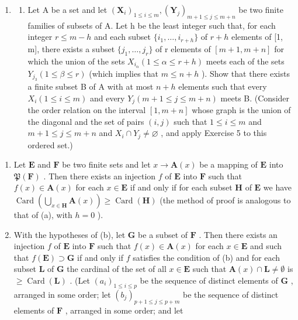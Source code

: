 \begin{enumerate}
\def\labelenumi{\arabic{enumi}.}
\setcounter{enumi}{5}
\tightlist
\item
  \begin{enumerate}
  \def\labelenumii{(\alph{enumii})}
  \tightlist
  \item
    Let A be a set and let \((\mathbf{X}_{i})_{1\leqslant i\leqslant m},(\mathbf{Y}_{j})_{m+1\leqslant j\leqslant m+n}\) be two finite families of subsets of A. Let h be the least integer such that, for each integer \(r\leqslant m-h\) and each subset \(\{i_{1},\ldots,i_{r+h}\}\) of \(r+h\) elements of {[}1, m{]}, there exists a subset \(\{j_{1},\ldots,j_{r}\}\) of r elements of \([m+1,m+n]\) for which the union of the sets \(X_{i_{\alpha}}(1\leqslant\alpha\leqslant r+h)\) meets each of the sets \(Y_{j_{3}}(1\leqslant\beta\leqslant r)\) (which implies that \(m\leqslant n+h\) ). Show that there exists a finite subset B of A with at most \(n+h\) elements such that every \(X_{i}(1\leqslant i\leqslant m)\) and every \(Y_{j}(m+1\leqslant j\leqslant m+n)\) meets B. (Consider the order relation on the interval \([1,m+n]\) whose graph is the union of the diagonal and the set of pairs \((i,j)\) such that \(1\leqslant i\leqslant m\) and \(m+1\leqslant j\leqslant m+n\) and \(X_{i}\cap Y_{j}\neq\varnothing\) , and apply Exercise 5 to this ordered set.)
  \end{enumerate}
\end{enumerate}

\begin{enumerate}
\def\labelenumi{(\alph{enumi})}
\setcounter{enumi}{1}
\item
  Let \(\mathbf{E}\) and \(\mathbf{F}\) be two finite sets and let \(x \to \mathbf{A}(x)\) be a mapping of \(\mathbf{E}\) into \(\mathfrak{P}(\mathbf{F})\) . Then there exists an injection \(f\) of \(\mathbf{E}\) into \(\mathbf{F}\) such that \(f(x) \in \mathbf{A}(x)\) for each \(x \in \mathbf{E}\) if and only if for each subset \(\mathbf{H}\) of \(\mathbf{E}\) we have \(\operatorname{Card}\left(\bigcup_{x \in \mathbf{H}} \mathbf{A}(x)\right) \geqslant \operatorname{Card}(\mathbf{H})\) (the method of proof is analogous to that of (a), with \(h = 0\) ).
\item
  With the hypotheses of (b), let \(\mathbf{G}\) be a subset of \(\mathbf{F}\) . Then there exists an injection \(f\) of \(\mathbf{E}\) into \(\mathbf{F}\) such that \(f(x) \in \mathbf{A}(x)\) for each \(x \in \mathbf{E}\) and such that \(f(\mathbf{E}) \supset \mathbf{G}\) if and only if \(f\) satisfies the condition of (b) and for each subset \(\mathbf{L}\) of \(\mathbf{G}\) the cardinal of the set of all \(x \in \mathbf{E}\) such that \(\mathbf{A}(x) \cap \mathbf{L} \neq \emptyset\) is \(\geqslant \operatorname{Card}(\mathbf{L})\) . (Let \((a_i)_{1 \leqslant i \leqslant p}\) be the sequence of distinct elements of \(\mathbf{G}\) , arranged in some order; let \((b_j)_{p+1 \leqslant j \leqslant p+m}\) be the sequence of distinct elements of \(\mathbf{F}\) , arranged in some order; and let
\end{enumerate}

